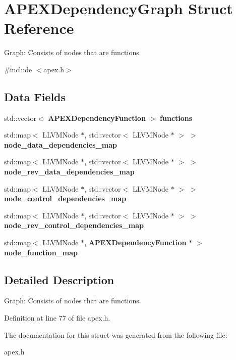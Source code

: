\section{A\+P\+E\+X\+Dependency\+Graph Struct Reference}
\label{structAPEXDependencyGraph}


Graph\+: Consists of nodes that are functions.  




{\ttfamily \#include $<$apex.\+h$>$}

\subsection*{Data Fields}
\begin{DoxyCompactItemize}
\item 
\mbox{\label{structAPEXDependencyGraph_ab358b0afe44dc73e8db4c53689de6aa8}} 
std\+::vector$<$ \textbf{ A\+P\+E\+X\+Dependency\+Function} $>$ {\bfseries functions}
\item 
\mbox{\label{structAPEXDependencyGraph_af6237ef27a89f712d5fe205f9052c31f}} 
std\+::map$<$ L\+L\+V\+M\+Node $\ast$, std\+::vector$<$ L\+L\+V\+M\+Node $\ast$ $>$ $>$ {\bfseries node\+\_\+data\+\_\+dependencies\+\_\+map}
\item 
\mbox{\label{structAPEXDependencyGraph_a77fa5ad74c62356a492bf9ca34ab50df}} 
std\+::map$<$ L\+L\+V\+M\+Node $\ast$, std\+::vector$<$ L\+L\+V\+M\+Node $\ast$ $>$ $>$ {\bfseries node\+\_\+rev\+\_\+data\+\_\+dependencies\+\_\+map}
\item 
\mbox{\label{structAPEXDependencyGraph_aaa39f9def7be8d9445ad9cc79ac71e3f}} 
std\+::map$<$ L\+L\+V\+M\+Node $\ast$, std\+::vector$<$ L\+L\+V\+M\+Node $\ast$ $>$ $>$ {\bfseries node\+\_\+control\+\_\+dependencies\+\_\+map}
\item 
\mbox{\label{structAPEXDependencyGraph_a4af93331f57e72ec825de47c860d2414}} 
std\+::map$<$ L\+L\+V\+M\+Node $\ast$, std\+::vector$<$ L\+L\+V\+M\+Node $\ast$ $>$ $>$ {\bfseries node\+\_\+rev\+\_\+control\+\_\+dependencies\+\_\+map}
\item 
\mbox{\label{structAPEXDependencyGraph_a582babaf3ee3b4c17c347d1c2917515d}} 
std\+::map$<$ L\+L\+V\+M\+Node $\ast$, \textbf{ A\+P\+E\+X\+Dependency\+Function} $\ast$ $>$ {\bfseries node\+\_\+function\+\_\+map}
\end{DoxyCompactItemize}


\subsection{Detailed Description}
Graph\+: Consists of nodes that are functions. 

Definition at line 77 of file apex.\+h.



The documentation for this struct was generated from the following file\+:\begin{DoxyCompactItemize}
\item 
apex.\+h\end{DoxyCompactItemize}
